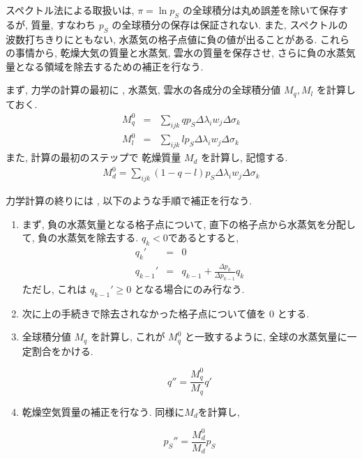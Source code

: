 スペクトル法による取扱いは,
$\pi = \ln p_S$ の全球積分は丸め誤差を除いて保存するが,
質量, すなわち $p_S$ の全球積分の保存は保証されない.
また, スペクトルの波数打ちきりにともない,
水蒸気の格子点値に負の値が出ることがある.
これらの事情から, 
乾燥大気の質量と水蒸気, 雲水の質量を保存させ,
さらに負の水蒸気量となる領域を除去するための補正を行なう.

まず, 力学の計算の最初に ,
水蒸気, 雲水の各成分の全球積分値 $M_q, M_l$ を計算しておく.
\begin{eqnarray}
  M_q^0 & = & \sum_{ijk} q p_S  \Delta\lambda_i w_j \Delta\sigma_k  \\
  M_l^0 & = & \sum_{ijk} l p_S  \Delta\lambda_i w_j \Delta\sigma_k 
\end{eqnarray}
また, 計算の最初のステップで
乾燥質量 $M_d$ を計算し, 記憶する.
\begin{eqnarray}
  M_d^0 = \sum_{ijk} (1-q-l) p_S \Delta\lambda_i w_j \Delta\sigma_k 
\end{eqnarray}

力学計算の終りには ,
以下のような手順で補正を行なう.
\begin{enumerate}
\item まず, 負の水蒸気量となる格子点について,
      直下の格子点から水蒸気を分配して,
      負の水蒸気を除去する.
      $q_k < 0 $であるとすると,
      \begin{eqnarray}
        q_k'     & = & 0          \\
        q_{k-1}' & = & q_{k-1} + \frac{\Delta p_k}{\Delta p_{k-1}} q_k
      \end{eqnarray}
      ただし, これは $q_{k-1}' \ge 0 $ となる場合にのみ行なう.

\item 次に上の手続きで除去されなかった格子点について値を 0 とする.

\item 全球積分値 $M_q$ を計算し,
      これが $M_q^0$ と一致するように,
      全球の水蒸気量に一定割合をかける.

      \begin{equation}
        q'' = \frac{M_q^0}{M_q} q' 
      \end{equation}
      
\item 乾燥空気質量の補正を行なう.
      同様に$M_d$を計算し,

      \begin{equation}
        p_S'' = \frac{M_d^0}{M_d} p_S
      \end{equation}

\end{enumerate}

